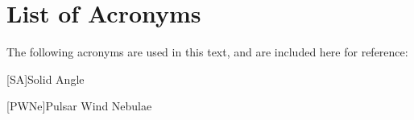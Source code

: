 
\chapter*{List of Acronyms}


The following acronyms are used in this text, and
are included here for reference:
\begin{acronym}
[SA]{Solid Angle}

[PWNe]{Pulsar Wind Nebulae}

\end{acronym}


